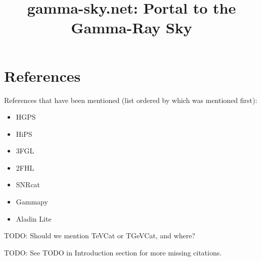 \documentclass{aip-cp}
\begin{document}
\title{gamma-sky.net: Portal to the Gamma-Ray Sky}


\maketitle

\begin{abstract}

\end{abstract}

\section{References}

References that have been mentioned (list ordered by which was mentioned first):

\begin{itemize}
  \item HGPS
  \item HiPS
  \item 3FGL
  \item 2FHL
  \item SNRcat
  \item Gammapy
  \item Aladin Lite

\end{itemize}


TODO: Should we mention TeVCat or TGeVCat, and where?


TODO: See TODO in Introduction section for more missing citations.













\nocite{*}


\end{document}
